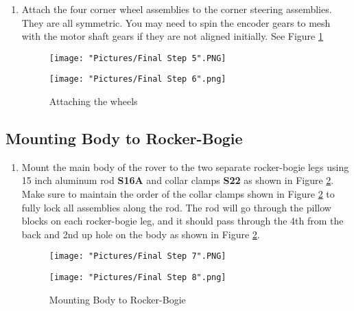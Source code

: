 \documentclass{article}
\begin{document}
\begin{enumerate}

\item Attach the four corner wheel assemblies to the corner steering assemblies. They are all symmetric. You may need to spin the encoder gears to mesh with the motor shaft gears if they are not aligned initially. See Figure \ref{wheels finished}

\begin{figure}[H]
  \centering
  \begin{minipage}[b]{0.45\textwidth}
    \texttt{[image: "Pictures/Final Step 5".PNG]}
  \end{minipage}
  \hfill
  \begin{minipage}[b]{0.45\textwidth}
    \texttt{[image: "Pictures/Final Step 6".png]}
  \end{minipage}
  \caption{Attaching the wheels}
  \label{wheels finished}
\end{figure}

\end{enumerate}

\subsection{Mounting Body to Rocker-Bogie}

\begin{enumerate}

\item Mount the main body of the rover to the two separate rocker-bogie legs using 15 inch aluminum rod \textbf{S16A} and collar clamps \textbf{S22} as shown in Figure \ref{body to rb}. Make sure to maintain the order of the collar clamps shown in Figure \ref{body to rb} to fully lock all assemblies along the rod. The rod will go through the pillow blocks on each rocker-bogie leg, and it should pass through the 4th from the back and 2nd up hole on the body as shown in Figure \ref{body to rb}.

\begin{figure}[H]
  \centering
  \begin{minipage}[b]{0.45\textwidth}
    \texttt{[image: "Pictures/Final Step 7".PNG]}
  \end{minipage}
  \hfill
  \begin{minipage}[b]{0.45\textwidth}
    \texttt{[image: "Pictures/Final Step 8".png]}
  \end{minipage}
  \caption{Mounting Body to Rocker-Bogie}
  \label{body to rb}
\end{figure}

\end{enumerate}
\end{document}
